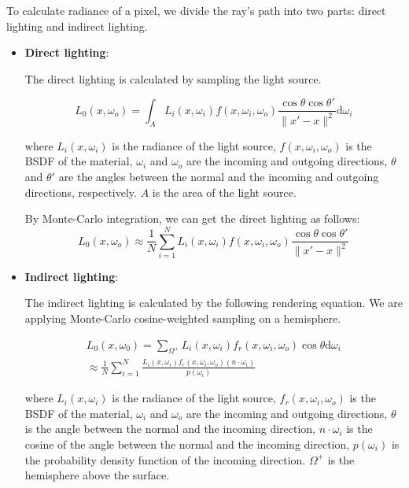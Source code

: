 \documentclass[acmtog]{acmart}
\begin{document}
To calculate radiance of a pixel, we divide the ray's path into two parts: direct lighting and indirect lighting.

\begin{itemize}
	\item \textbf{Direct lighting}:
	
	The direct lighting is calculated by sampling the light source.
	
	\[
		L_0 (x, \omega_o) = \int_{A} L_i(x, \omega_i) f(x, \omega_i, \omega_o)  \frac{\cos \theta \cos \theta'}{\| x' - x \|^2} \mathrm{d}\omega_i
	\]

	where $L_i(x, \omega_i)$ is the radiance of the light source, $f(x, \omega_i, \omega_o)$ is the BSDF of the material, $\omega_i$ and $\omega_o$ are the incoming and outgoing directions, $\theta$ and $\theta'$ are the angles between the normal and the incoming and outgoing directions, respectively. $A$ is the area of the light source.

	By Monte-Carlo integration, we can get the direct lighting as follows:
	\[
		L_0 (x, \omega_o) \approx \frac{1}{N} \sum_{i=1}^{N} L_i(x, \omega_i) f(x, \omega_i, \omega_o)  \frac{\cos \theta \cos \theta'}{\| x' - x \|^2}
	\]

	\item \textbf{Indirect lighting}:
	
	The indirect lighting is calculated by the following rendering equation. We are applying Monte-Carlo cosine-weighted sampling on a hemisphere.

	\[
		\begin{aligned}
			L_0(x, \omega_0) = \sum_{\Omega^+} L_i(x, \omega_i) f_r(x, \omega_i, \omega_o) \cos\theta \mathrm{d} \omega_i\\
			\approx \frac{1}{N} \sum_{i=1}^{N} \frac{L_i(x, \omega_i) f_r(x, \omega_i, \omega_o)(n\cdot \omega_i)}{p(\omega_i)}
		\end{aligned}
	\]

	where $L_i(x, \omega_i)$ is the radiance of the light source, $f_r(x, \omega_i, \omega_o)$ is the BSDF of the material, $\omega_i$ and $\omega_o$ are the incoming and outgoing directions, $\theta$ is the angle between the normal and the incoming direction, $n\cdot \omega_i$ is the cosine of the angle between the normal and the incoming direction, $p(\omega_i)$ is the probability density function of the incoming direction. $\Omega^+$ is the hemisphere above the surface.


\end{itemize}
\end{document}
